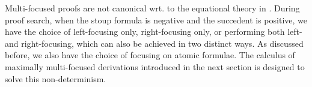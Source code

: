 \documentclass[runningheads]{llncs}
\renewcommand{\vec}{\overrightarrow}
\newcommand{\tr}{\otimes \mathsf{R}}
\newcommand{\lleft}{{\multimap}\mathsf{L}}
\newcommand{\pass}{\mathsf{pass}}
\newcommand{\otR}{\tr}
\newcommand{\lolliL}{\lleft}
\newcommand{\ot}{\otimes}
\newcommand{\lolli}{\multimap}
\newcommand{\niccolo}[1]{{\color{red}\textbf{Niccol{\`o}: }#1}}
\newcommand{\up}{\Uparrow}
\newcommand{\dn}{\Downarrow}
\newcommand{\focL}{\mathsf{foc_L}}
\newcommand{\foc}{\mathsf{foc}}
\newcommand{\blurL}{\mathsf{blur_L}}
\newcommand{\unfoc}{\mathsf{unfoc}}
\newcommand{\focus}{\mathsf{focus}}
\newcommand{\emb}{\mathsf{emb}}
\begin{document}
Multi-focused proofs are not canonical wrt. to the equational theory in . During proof search, when the stoup formula is negative and the succedent is positive, we have the choice of left-focusing only, right-focusing only, or performing both left- and right-focusing, which can also be achieved in two distinct ways. As discussed before, we also have the choice of focusing on atomic formulae. %
The calculus of maximally multi-focused derivations introduced in the next section is designed to solve this non-determinism.


\end{document}
